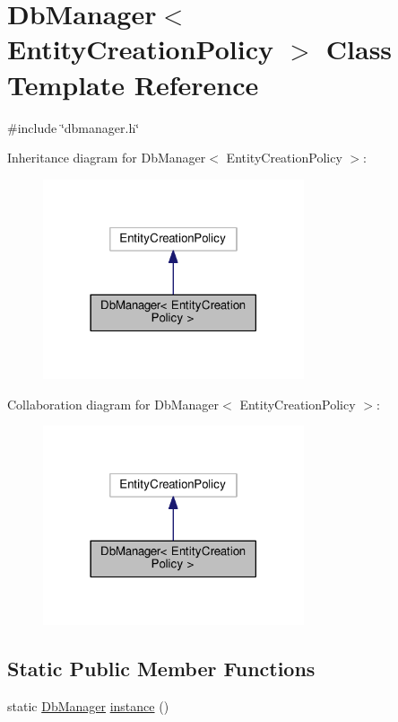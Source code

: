 \hypertarget{classDbManager}{}\section{Db\+Manager$<$ Entity\+Creation\+Policy $>$ Class Template Reference}
\label{classDbManager}


{\ttfamily \#include \char`\"{}dbmanager.\+h\char`\"{}}



Inheritance diagram for Db\+Manager$<$ Entity\+Creation\+Policy $>$\+:\nopagebreak
\begin{figure}[H]
\begin{center}
\leavevmode
\includegraphics[width=218pt]{classDbManager__inherit__graph}
\end{center}
\end{figure}


Collaboration diagram for Db\+Manager$<$ Entity\+Creation\+Policy $>$\+:\nopagebreak
\begin{figure}[H]
\begin{center}
\leavevmode
\includegraphics[width=218pt]{classDbManager__coll__graph}
\end{center}
\end{figure}
\subsection*{Static Public Member Functions}
\begin{DoxyCompactItemize}
\item 
static \mbox{\hyperlink{classDbManager}{Db\+Manager}} \mbox{\hyperlink{classDbManager_ab470cdc17355eec8153533c74d022298}{instance}} ()
\end{DoxyCompactItemize}
